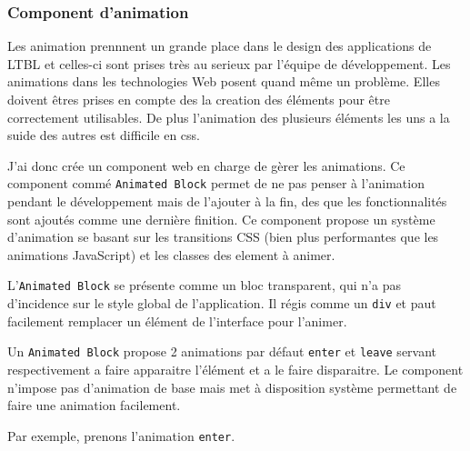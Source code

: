 \subsubsection{Component d'animation}
\label{animationblock}

Les animation prennnent un grande place dans le design des applications de LTBL et celles-ci sont prises très au serieux par l'équipe de développement.
Les animations dans les technologies Web posent quand même un problème.
Elles doivent êtres prises en compte des la creation des éléments pour être correctement utilisables.
De plus l'animation des plusieurs éléments les uns a la suide des autres est difficile en css.

J'ai donc crée un component web en charge de gèrer les animations.
Ce component commé \texttt{Animated Block} permet de ne pas penser à l'animation pendant le développement mais de l'ajouter à la fin, des que les fonctionnalités sont ajoutés comme une dernière finition.
Ce component propose un système d'animation se basant sur les transitions CSS (bien plus performantes que les animations JavaScript) et les classes des element à animer.

L'\texttt{Animated Block} se présente comme un bloc transparent, qui n'a pas d'incidence sur le style global de l'application.
Il régis comme un \texttt{div} et paut facilement remplacer un élément de l'interface pour l'animer.

Un \texttt{Animated Block} propose 2 animations par défaut \texttt{enter} et \texttt{leave} servant respectivement a faire apparaitre l'élément et a le faire disparaitre.
Le component n'impose pas d'animation de base mais met à disposition système permettant de faire une animation facilement.

Par exemple, prenons l'animation \texttt{enter}.

